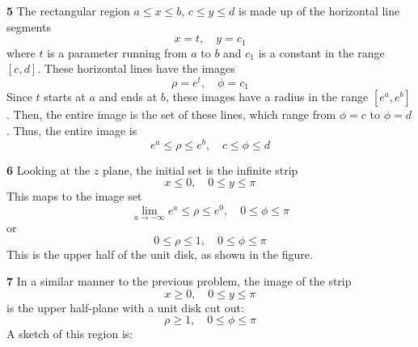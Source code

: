 \documentclass{article}
\begin{document}
\textbf{5}
The rectangular region $a \le x \le b$, $c \le y \le d$ is made up of the horizontal line segments
\[
	x = t,	\quad	y = c_1
\]
where $t$ is a parameter running from $a$ to $b$ and $c_1$ is a constant in the range $[c, d]$. These horizontal lines have the images
\[
	\rho = e^t,	\quad	\phi = c_1
\]
Since $t$ starts at $a$ and ends at $b$, these images have a radius in the range $[e^a, e^b]$. Then, the entire image is the set of these lines, which range from $\phi = c$ to $\phi = d$. Thus, the entire image is
\[
	e^a \le \rho \le e^b,	\quad	c \le \phi \le d
\]


\textbf{6}
Looking at the $z$ plane, the initial set is the infinite strip
\[
	x \le 0, \quad	0 \le y \le \pi
\]
This maps to the image set
\[
	\lim_{a \to -\infty} e^{a} \le \rho \le e^0,	\quad 0 \le \phi \le \pi
\]
or
\[
	0 \le \rho \le 1,	\quad 0 \le \phi \le \pi
\]
This is the upper half of the unit disk, as shown in the figure.


\textbf{7}
In a similar manner to the previous problem, the image of the strip
\[
	x \ge 0, \quad	0 \le y \le \pi
\]
is the upper half-plane with a unit disk cut out:
\[
	\rho \ge 1,	\quad	0 \le \phi \le \pi
\]
A sketch of this region is:
\begin{center}
\end{center}
\end{document}
